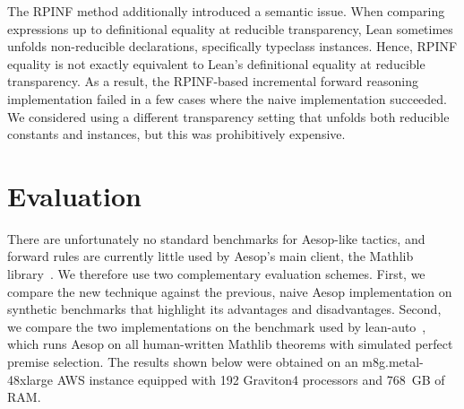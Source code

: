 The RPINF method additionally introduced a semantic issue.
When comparing expressions up to definitional equality at reducible transparency, Lean sometimes unfolds non-reducible declarations, specifically typeclass instances.
Hence, RPINF equality is not exactly equivalent to Lean's definitional equality at reducible transparency.
As a result, the RPINF-based incremental forward reasoning implementation failed in a few cases where the naive implementation succeeded.
We considered using a different transparency setting that unfolds both reducible constants and instances, but this was prohibitively expensive.

\section{Evaluation}%
\label{sec:forward:evaluation}

There are unfortunately no standard benchmarks for Aesop-like tactics, and forward rules are currently little used by Aesop's main client, the Mathlib library~\cite{Mathlib}.
We therefore use two complementary evaluation schemes.
First, we compare the new technique against the previous, naive Aesop implementation on synthetic benchmarks that highlight its advantages and disadvantages.
Second, we compare the two implementations on the benchmark used by lean-auto~\cite{lean-auto}, which runs Aesop on all human-written Mathlib theorems with simulated perfect premise selection.
The results shown below were obtained on an m8g.metal-48xlarge AWS instance equipped with 192 Graviton4 processors and \SI{768}{GB} of RAM.


